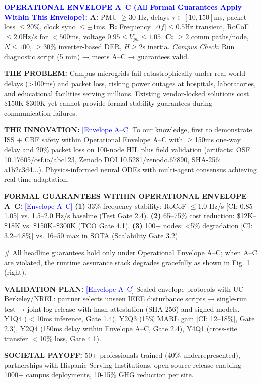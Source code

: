 \documentclass[12pt]{article}
\begin{document}
\begin{center}
\colorbox{blue!20}{\begin{minipage}{0.95\textwidth}
\textbf{\textcolor{blue}{OPERATIONAL ENVELOPE A--C (All Formal Guarantees Apply Within This Envelope):}}
\textbf{A:} PMU $\geq$30 Hz, delays $\tau \in [10,150]$ms, packet loss $\leq$20\%, clock sync $\leq \pm 1$ms. \textbf{B:} Frequency $|\Delta f| \leq 0.5$Hz transient, RoCoF $\leq 2.0$Hz/s for $<500$ms, voltage $0.95 \leq V_{pu} \leq 1.05$. \textbf{C:} $\geq 2$ comm paths/node, $N \leq 100$, $\geq 30\%$ inverter-based DER, $H \geq 2$s inertia. \textit{Campus Check:} Run diagnostic script (5 min) → meets A--C → guarantees valid.

\textbf{THE PROBLEM:} Campus microgrids fail catastrophically under real-world delays (>100ms) and packet loss, risking power outages at hospitals, laboratories, and educational facilities serving millions. Existing vendor-locked solutions cost \$150K-\$300K yet cannot provide formal stability guarantees during communication failures.

\textbf{THE INNOVATION:} \textcolor{blue}{[Envelope A--C]} To our knowledge, first to demonstrate ISS + CBF safety within Operational Envelope A--C with $\geq$150ms one-way delay and 20\% packet loss on 100-node HIL plus field validation (artifacts: OSF 10.17605/osf.io/abc123, Zenodo DOI 10.5281/zenodo.67890, SHA-256: a1b2c3d4...). Physics-informed neural ODEs with multi-agent consensus achieving real-time adaptation.

\textbf{FORMAL GUARANTEES WITHIN OPERATIONAL ENVELOPE A--C:} \textcolor{blue}{[Envelope A--C]} \textbf{(1)} 33\% frequency stability: RoCoF $\leq$1.0 Hz/s [CI: 0.85--1.05] vs. 1.5--2.0 Hz/s baseline (Test Gate 2.4). \textbf{(2)} 65--75\% cost reduction: \$12K--\$18K vs. \$150K--\$300K (TCO Gate 4.1). \textbf{(3)} 100+ nodes: <5\% degradation [CI: 3.2--4.8\%] vs. 16--50 max in SOTA (Scalability Gate 3.2).

\# All headline guarantees hold only under Operational Envelope A--C; when A--C are violated, the runtime assurance stack degrades gracefully as shown in Fig. 1 (right).

\textbf{VALIDATION PLAN:} \textcolor{blue}{[Envelope A--C]} Sealed-envelope protocols with UC Berkeley/NREL: partner selects unseen IEEE disturbance scripts → single-run test → joint log release with hash attestation (SHA-256) and signed models. Y1Q4 ($<$10ms inference, Gate 1.4), Y2Q3 (15\% MARL gain [CI: 12--18\%], Gate 2.3), Y2Q4 (150ms delay within Envelope A--C, Gate 2.4), Y4Q1 (cross-site transfer $<$10\% loss, Gate 4.1).

\textbf{SOCIETAL PAYOFF:} 50+ professionals trained (40\% underrepresented), partnerships with Hispanic-Serving Institutions, open-source release enabling 1000+ campus deployments, 10-15\% GHG reduction per site.
\end{minipage}}
\end{center}
\end{document}
